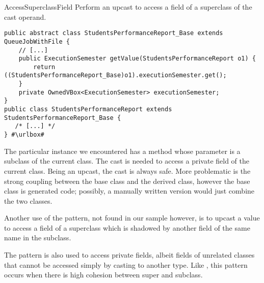 \begin{pattern}{AccessSuperclassField}
Perform an upcast to access a field of a superclass of the cast operand.

\instances{}

\def\urlvar{http://bit.ly/FenixEdu_fenixedu_academic_2SQxlkC}
\begin{verbatim}
public abstract class StudentsPerformanceReport_Base extends QueueJobWithFile {
    // [...]
    public ExecutionSemester getValue(StudentsPerformanceReport o1) {
        return ((StudentsPerformanceReport_Base)o1).executionSemester.get();
    }
    private OwnedVBox<ExecutionSemester> executionSemester;
}
public class StudentsPerformanceReport extends StudentsPerformanceReport_Base {
   /* [...] */
} #\urlbox#
\end{verbatim}

\discussion{}
The particular instance we encountered has a method whose parameter is a
  subclass of the current class. The cast is needed to access a private
  field of the current class.
  Being an upcast, the cast is always safe. More problematic is the strong coupling 
  between the base class and the derived class, however the base class is
  generated code; possibly, a manually written version would just combine the
  two classes.

  Another use of the pattern, not found in our sample however,
  is to upcast a value to access a field of a superclass 
  which is shadowed by another field of the same name in the subclass.

  The  pattern is also used to access
  private fields, albeit fields of unrelated classes that cannot be accessed
  simply by casting to another type.
  Like , this pattern occurs
  when there is high cohesion between super and subclass.

\end{pattern}

